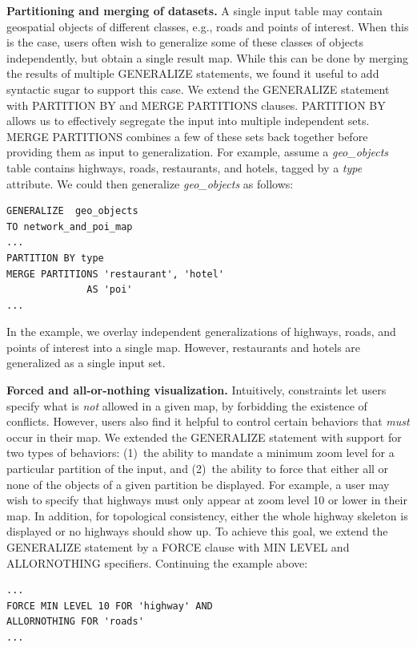 \documentclass[11pt, oneside]{report}
\newcommand{\minisec}[1]{\noindent\textbf{#1.}}
\begin{document}
\minisec{Partitioning and merging of datasets} 
A single input table may contain geospatial objects of different classes, e.g., roads and points of interest. When this is the case, users often wish to generalize some of these classes of objects independently, but obtain a single result map. While this can be done by merging the results of multiple GENERALIZE statements, we found it useful to add syntactic sugar to support this case. We extend the GENERALIZE statement with PARTITION BY and MERGE PARTITIONS clauses. PARTITION BY allows us to effectively segregate the input into multiple independent sets. MERGE PARTITIONS combines a few of these sets back together before providing them as input to generalization. For example, assume a \emph{geo\_objects} table contains highways, roads, restaurants, and hotels, tagged by a \emph{type} attribute. We could then generalize \emph{geo\_objects} as follows:

\begin{lstlisting}
GENERALIZE  geo_objects
TO network_and_poi_map
...
PARTITION BY type
MERGE PARTITIONS 'restaurant', 'hotel' 
              AS 'poi'
... 
\end{lstlisting}

In the example, we overlay independent generalizations of highways, roads, and points of interest into a single map. However, restaurants and hotels are generalized as a single input set.  

\minisec{Forced and all-or-nothing visualization}
Intuitively, constraints let users specify what is \emph{not} allowed in a given map, by forbidding the existence of conflicts. However, users also find it helpful to control certain behaviors that \emph{must} occur in their map. We extended the GENERALIZE statement with support for two types of behaviors: (1)~the ability to mandate a minimum zoom level for a particular partition of the input, and (2)~the ability to force that either all or none of the objects of a given partition be displayed. For example, a user may wish to specify that highways must only appear at zoom level 10 or lower in their map. In addition, for topological consistency, either the whole highway skeleton is displayed or no highways should show up. To achieve this goal, we extend the GENERALIZE statement by a FORCE clause with MIN LEVEL and ALLORNOTHING specifiers. Continuing the example above:

\begin{lstlisting}
...
FORCE MIN LEVEL 10 FOR 'highway' AND
ALLORNOTHING FOR 'roads'
... 
\end{lstlisting}
\end{document}
